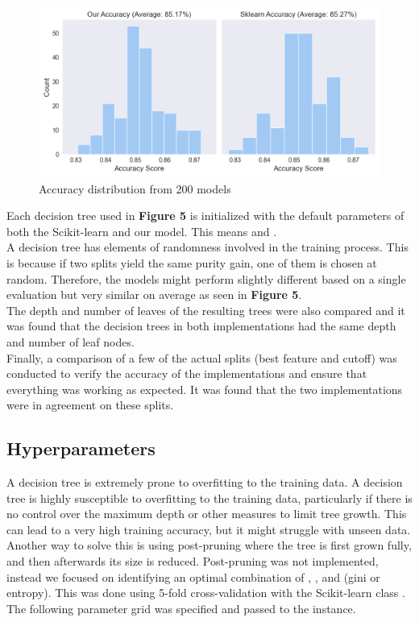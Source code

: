 \begin{figure}[H]
    \centering
    \includegraphics[scale=0.55]{figures_for_report/our_vs_sklearn_accuracy}
    \captionsetup{justification=centering,margin=2cm}
    \caption{Accuracy distribution from 200 models}
\end{figure}

Each decision tree used in \textbf{Figure 5} is initialized with the default parameters of both the Scikit-learn and our model.
This means  and . \\

A decision tree has elements of randomness involved in the training process.
This is because if two splits yield the same purity gain, one of them is chosen at random.
Therefore, the models might perform slightly different based on a single evaluation but very similar on average as seen in \textbf{Figure 5}.\\

The depth and number of leaves of the resulting trees were also compared and it was found that the decision trees in both implementations had the same depth and number of leaf nodes.
\\

Finally, a comparison of a few of the actual splits (best feature and cutoff) was conducted to verify the accuracy of the implementations and ensure that everything was working as expected.
It was found that the two implementations were in agreement on these splits.

\subsection{Hyperparameters}
A decision tree is extremely prone to overfitting to the training data.
A decision tree is highly susceptible to overfitting to the training data, particularly if there is no control over the maximum depth or other measures to limit tree growth.
This can lead to a very high training accuracy, but it might struggle with unseen data.
Another way to solve this is using post-pruning where the tree is first grown fully, and then afterwards its size is reduced.
Post-pruning was not implemented, instead we focused on identifying an optimal combination of , , and  (gini or entropy).
This was done using 5-fold cross-validation with the Scikit-learn class .
The following parameter grid was specified and passed to the  instance.

